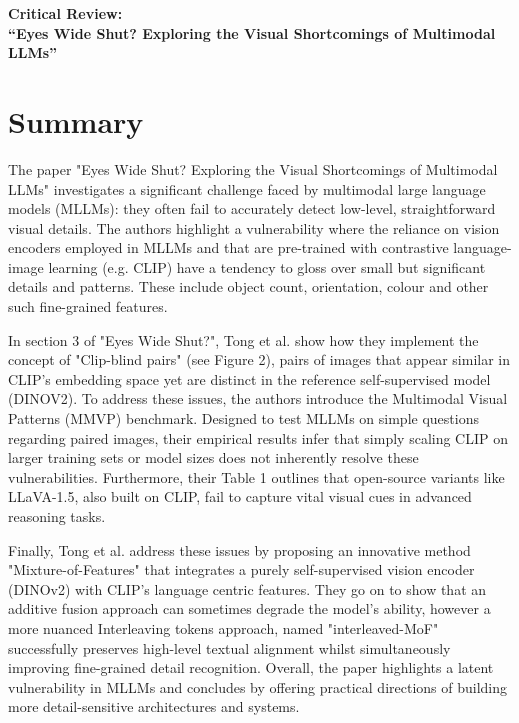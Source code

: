 \documentclass[11pt]{article}
\begin{document}
\thispagestyle{fancy}

\begin{center}
    {\large \textbf{Critical Review:}\\
    \textbf{``Eyes Wide Shut? Exploring the Visual Shortcomings of Multimodal LLMs''}}
\end{center}

\section*{Summary}

The paper "Eyes Wide Shut? Exploring the Visual Shortcomings of Multimodal LLMs" \cite{Tong2024CVPR} investigates a significant challenge faced by multimodal large language models (MLLMs): they often fail to accurately detect low-level, straightforward visual details.
The authors highlight a vulnerability where the reliance on vision encoders employed in MLLMs and that are pre-trained with contrastive language-image learning (e.g. CLIP) have a tendency to gloss over small but significant details and patterns. These include object count, orientation, colour and other such fine-grained features.

In section 3 of "Eyes Wide Shut?", Tong et al. show how they implement the concept of "Clip-blind pairs" (see Figure 2), pairs of images that appear similar in CLIP's \cite{Radford2021_CLIP} embedding space yet are distinct in the reference self-supervised model (DINOV2).
To address these issues, the authors introduce the Multimodal Visual Patterns (MMVP) benchmark. Designed to test MLLMs on simple questions regarding paired images, their empirical results infer that simply scaling CLIP on larger training sets or model sizes does not inherently resolve these vulnerabilities.
Furthermore, their Table 1 outlines that open-source variants like LLaVA-1.5, also built on CLIP, fail to capture vital visual cues in advanced reasoning tasks.

Finally, Tong et al. address these issues by proposing an innovative method "Mixture-of-Features" that integrates a purely self-supervised vision encoder (DINOv2) with CLIP's language centric features. They go on to show that an additive fusion approach can sometimes degrade the model's ability, however a more nuanced
Interleaving tokens approach, named "interleaved-MoF" successfully preserves high-level textual alignment whilst simultaneously improving fine-grained detail recognition. Overall, the paper highlights a latent vulnerability in MLLMs and concludes by offering practical directions of building more detail-sensitive architectures and systems.
\end{document}
